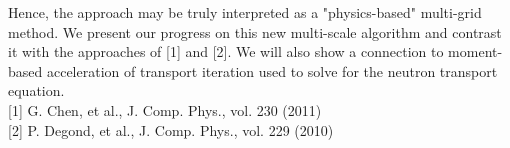 \documentclass{report}
\begin{document}
\noindent Hence, the approach may be truly interpreted as a
"physics-based" multi-grid method. We present our progress on this new
multi-scale algorithm and contrast it with the approaches of [1] and [2].
We will also show a connection to moment-based acceleration of transport
iteration used to solve for the neutron transport equation.\\[4pt] [1] G.
Chen, et al., J. Comp. Phys., vol. 230 (2011)
\\[0pt] [2] P. Degond, et al., J. Comp. Phys., vol. 229 (2010)
\end{document}
